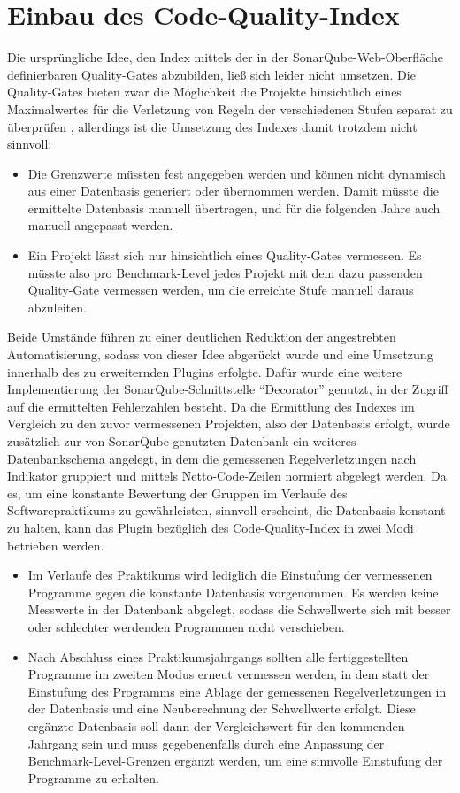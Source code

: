 \documentclass[da,ngerman]{stthesis}
\begin{document}
		\section{Einbau des Code-Quality-Index}
			Die ursprüngliche Idee, den Index mittels der in der SonarQube-Web-Oberfläche definierbaren Quality-Gates abzubilden, ließ sich leider nicht umsetzen. Die Quality-Gates bieten zwar die Möglichkeit die Projekte hinsichtlich eines Maximalwertes für die Verletzung von Regeln der verschiedenen Stufen separat zu überprüfen \cite{QualityGates}, allerdings ist die Umsetzung des Indexes damit trotzdem nicht sinnvoll:
			\begin{itemize}
				\item Die Grenzwerte müssten fest angegeben werden und können nicht dynamisch aus einer Datenbasis generiert oder übernommen werden. Damit müsste die ermittelte Datenbasis manuell übertragen, und für die folgenden Jahre auch manuell angepasst werden.
				\item Ein Projekt lässt sich nur hinsichtlich eines Quality-Gates vermessen. Es müsste also pro Benchmark-Level jedes Projekt mit dem dazu passenden Quality-Gate vermessen werden, um die erreichte Stufe manuell daraus abzuleiten.
			\end{itemize}
			Beide Umstände führen zu einer deutlichen Reduktion der angestrebten Automatisierung, sodass von dieser Idee abgerückt wurde und eine Umsetzung innerhalb des zu erweiternden Plugins erfolgte. Dafür wurde eine weitere Implementierung der SonarQube-Schnittstelle "`Decorator"' genutzt, in der Zugriff auf die ermittelten Fehlerzahlen besteht. \newline
			Da die Ermittlung des Indexes im Vergleich zu den zuvor vermessenen Projekten, also der Datenbasis erfolgt, wurde zusätzlich zur von SonarQube genutzten Datenbank ein weiteres Datenbankschema angelegt, in dem die gemessenen Regelverletzungen nach Indikator gruppiert und mittels Netto-Code-Zeilen normiert abgelegt werden. Da es, um eine konstante Bewertung der Gruppen im Verlaufe des Softwarepraktikums zu gewährleisten, sinnvoll erscheint, die Datenbasis konstant zu halten, kann das Plugin bezüglich des Code-Quality-Index in zwei Modi betrieben werden. 
			\begin{itemize}
				\item Im Verlaufe des Praktikums wird lediglich die Einstufung der vermessenen Programme gegen die konstante Datenbasis vorgenommen. Es werden keine Messwerte in der Datenbank abgelegt, sodass die Schwellwerte sich mit besser oder schlechter werdenden Programmen nicht verschieben.
				\item Nach Abschluss eines Praktikumsjahrgangs sollten alle fertiggestellten Programme im zweiten Modus erneut vermessen werden, in dem statt der Einstufung des Programms eine Ablage der gemessenen Regelverletzungen in der Datenbasis und eine Neuberechnung der Schwellwerte erfolgt. Diese ergänzte Datenbasis soll dann der Vergleichswert für den kommenden Jahrgang sein und muss gegebenenfalls durch eine Anpassung der Benchmark-Level-Grenzen ergänzt werden, um eine sinnvolle Einstufung der Programme zu erhalten.	
			\end{itemize}	
\end{document}
